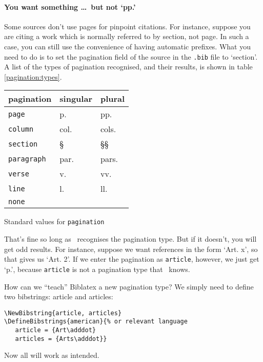 \paragraph{You want something \ldots\ but not `pp.'} Some sources
don't use pages for pinpoint citations. For instance, suppose you are
citing a work which is normally referred to by section, not page. In
such a case, you can still use the convenience of having automatic
prefixes. What you need to do is to set the pagination field of the
source in the \texttt{.bib} file to `section'. A list of the types of
pagination recognised, and their results, is shown in table
\ref{pagination:types}.
\begin{margintable}
\begin{tabular}{lll}
  \toprule
  \textsf{pagination} & \textsf{singular} & \textsf{plural} \\
  \midrule
  \texttt{page}       & p.                & pp.             \\
  \texttt{column}     & col.              & cols.           \\
  \texttt{section}    & \S                & \S\S            \\
  \texttt{paragraph}  & par.              & pars.           \\
  \texttt{verse}      & v.                & vv.             \\
  \texttt{line}       & l.                & ll.             \\
  \texttt{none}                                             \\
  \bottomrule
\end{tabular}
\caption[3pt]{Standard values for \texttt{pagination}\label{pagination:types}}
\end{margintable}


That’s fine so long as \biblatex\ recognises the pagination type. But if
it doesn’t, you will get odd results. For instance, suppose we want
references in the form `Art. x', so that  gives us
`Art. 2'. If we enter the pagination as \texttt{article}, however, we
just get `p.', because \texttt{article} is not a
pagination type that \biblatex\ knows.

How can we “teach” Biblatex a new pagination type? We simply need to
define two bibstrings: article and articles:

\begin{verbatim}
\NewBibstring{article, articles}
\DefineBibstrings{american}{% or relevant language
   article = {Art\adddot}
   articles = {Arts\adddot}}
\end{verbatim}
Now all will work as intended. 

